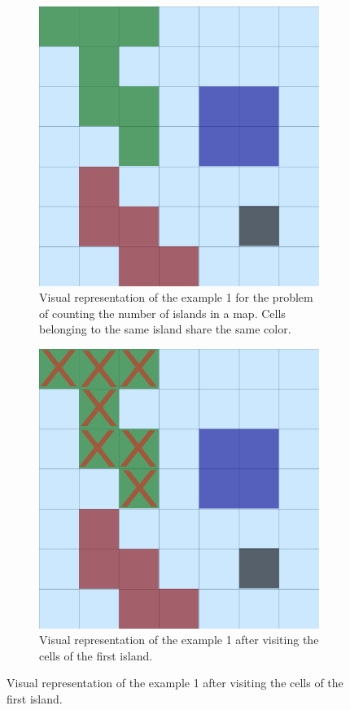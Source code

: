\begin{figure}
	\centering
	\begin{subfigure}[t]{0.45\textwidth}
		\centering
		\includegraphics[width=\textwidth]{sources/number_islands/images/example1}
		\caption{Visual representation of the example 1 for the problem of counting the number of islands in a map. Cells belonging to the same island share the same color.}
		\label{fig:number_islands:example1}
	\end{subfigure}
	\hfill
	\begin{subfigure}[t]{0.45\textwidth}
		\centering
		\includegraphics[width=\textwidth]{sources/number_islands/images/visited}
		\caption{Visual representation of the example 1 after visiting the cells of the first island.}
		\label{fig:number_islands:example1_visited}
	\end{subfigure}
\end{figure}

